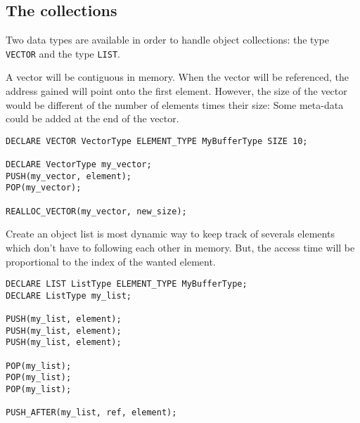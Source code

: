\documentclass[american]{rtxreport}
\begin{document}

\subsection{The collections}

Two data types are available in order to handle object collections:
the type \texttt{VECTOR} and the type \texttt{LIST}.

A vector will be contiguous in memory. When the vector will be referenced, the address gained
will point onto the first element. However, the size of the vector would be different of
the number of elements times their size: Some meta-data could be added at the end
of the vector.


\begin{lstlisting}
DECLARE VECTOR VectorType ELEMENT_TYPE MyBufferType SIZE 10;

DECLARE VectorType my_vector;
PUSH(my_vector, element);
POP(my_vector);

REALLOC_VECTOR(my_vector, new_size);
\end{lstlisting}


Create an object list is most dynamic way to keep track of severals elements
which don't have to following each other in memory. But, the access time
will be proportional to the index of the wanted element.

\begin{lstlisting}
DECLARE LIST ListType ELEMENT_TYPE MyBufferType;
DECLARE ListType my_list;

PUSH(my_list, element);
PUSH(my_list, element);
PUSH(my_list, element);

POP(my_list);
POP(my_list);
POP(my_list);

PUSH_AFTER(my_list, ref, element);
\end{lstlisting}

\end{document}
